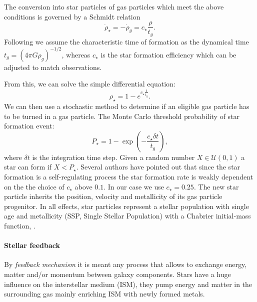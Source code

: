 The conversion into star particles of gas particles which meet the above conditions is governed by a Schmidt relation \citep{Schmidt1959}
\begin{equation}                                                                              
\dot{\rho}_\star = -\dot{\rho}_g = c_\star \frac{\rho}{t_g}.
\label{eq:schmidt_relation}
\end{equation}
Following \citep{Stinson2006} we assume the characteristic time of formation as the dynamical time $t_g = (4 \pi G \rho_g)^{-1/2}$, whereas $c_\star$ is the star formation efficiency which can be adjusted to match observations.

From this, we can solve the simple differential equation: 
\begin{equation}
\rho_\star = 1 - e^{c_\star \frac{t}{t_g}}.
\end{equation}
We can then use a stochastic method to determine if an eligible gas particle has to be turned in a gas particle.
The Monte Carlo threshold probability of star formation event:
\begin{equation}
P_\star = 1-\exp(-\frac{c_\star \delta t}{t_g}),
\end{equation}
where $\delta t$ is the integration time step.
Given a random number $X \in \mathcal{U}(0,1)$ a star can form if $X < P_\star$.
Several authors \citep{Stinson2006, Cloet-Osselaer2012, Revaz2009} have pointed out that since the star formation is a self-regulating process the star formation rate is weakly dependent on the the choice of $c_\star$ above $0.1$. In our case we use $c_\star = 0.25$.
The new star particle inherits the position, velocity and metallicity of its gas particle progenitor.
In all effects, star particles represent a stellar population with single age and metallicity (SSP, Single Stellar Population) with a Chabrier initial-mass function, \citet{Chabrier2003}.

\paragraph{Stellar feedback}
By \emph{feedback mechanism} it is meant any process that allows to exchange energy, matter and/or momentum between galaxy components. Stars have a huge influence on the interstellar medium (ISM), they pump energy and matter in the surrounding gas mainly enriching ISM with newly formed metals.

